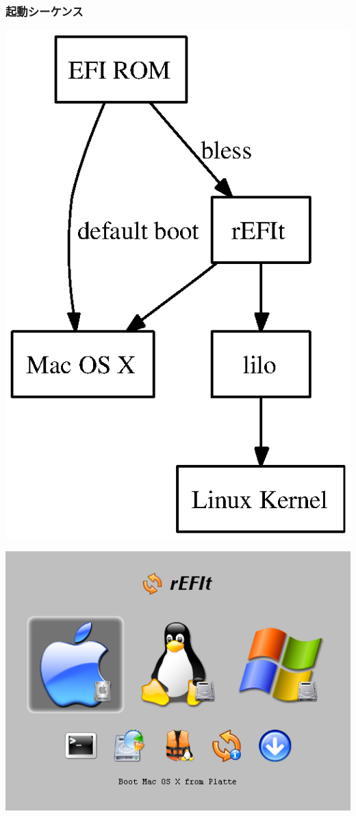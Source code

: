 \documentclass[cjk,dvipdfmx]{beamer}
\begin{document}
\begin{frame}
\frametitle{起動シーケンス}
\begin{minipage}[t]{0.4\hsize}
\includegraphics[height=1\hsize]{image200607/bootchain.ps}
\end{minipage}
\begin{minipage}[t]{0.58\hsize}
\includegraphics[width=1\hsize]{image200607/screen1.png}
\end{minipage}
\end{frame}
\end{document}

